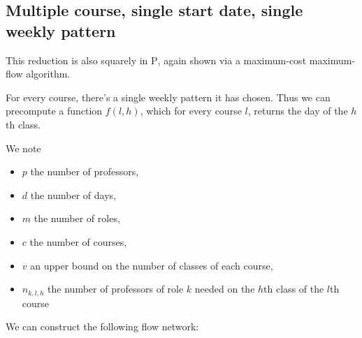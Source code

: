 \subsection{Multiple course, single start date, single weekly pattern}

This reduction is also squarely in \textsc{P}, again shown via a maximum-cost maximum-flow algorithm.

For every course, there's a single weekly pattern it has chosen. Thus we can precompute a function $f(l, h)$, which for every course $l$, returns the day of the $h$th class.

We note
\begin{itemize}
  \item $p$ the number of professors,
  \item $d$ the number of days,
  \item $m$ the number of roles,
  \item $c$ the number of courses,
  \item $v$ an upper bound on the number of classes of each course,
  \item $n_{k, l, h}$ the number of professors of role $k$ needed on the $h$th class of the $l$th course
\end{itemize}

We can construct the following flow network:

